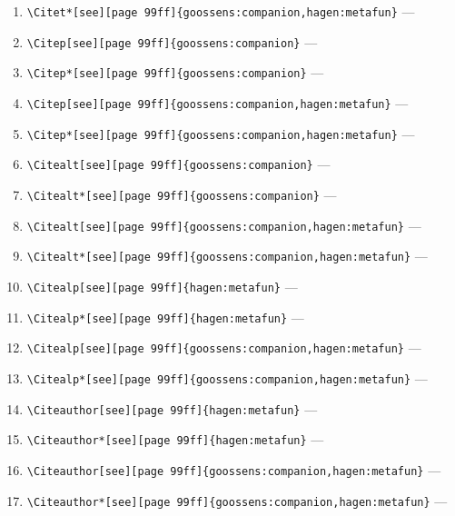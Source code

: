 \documentclass[12pt]{article}
\begin{document}
\begin{enumerate}
\verb|\Citet[see][page 99ff]{goossens:companion,hagen:metafun}| --- 
\item
\verb|\Citet*[see][page 99ff]{goossens:companion,hagen:metafun}| --- 
\item
\verb|\Citep[see][page 99ff]{goossens:companion}| --- 
\item
\verb|\Citep*[see][page 99ff]{goossens:companion}| --- 
\item
\verb|\Citep[see][page 99ff]{goossens:companion,hagen:metafun}| --- 
\item
\verb|\Citep*[see][page 99ff]{goossens:companion,hagen:metafun}| --- 
\item
\verb|\Citealt[see][page 99ff]{goossens:companion}| --- 
\item
\verb|\Citealt*[see][page 99ff]{goossens:companion}| --- 
\item
\verb|\Citealt[see][page 99ff]{goossens:companion,hagen:metafun}| --- 
\item
\verb|\Citealt*[see][page 99ff]{goossens:companion,hagen:metafun}| --- 
\item
\verb|\Citealp[see][page 99ff]{hagen:metafun}| --- 
\item
\verb|\Citealp*[see][page 99ff]{hagen:metafun}| --- 
\item
\verb|\Citealp[see][page 99ff]{goossens:companion,hagen:metafun}| --- 
\item
\verb|\Citealp*[see][page 99ff]{goossens:companion,hagen:metafun}| --- 
\item
\verb|\Citeauthor[see][page 99ff]{hagen:metafun}| --- 
\item
\verb|\Citeauthor*[see][page 99ff]{hagen:metafun}| --- 
\item
\verb|\Citeauthor[see][page 99ff]{goossens:companion,hagen:metafun}| --- 
\item
\verb|\Citeauthor*[see][page 99ff]{goossens:companion,hagen:metafun}| --- 
\end{enumerate}
\end{document}
